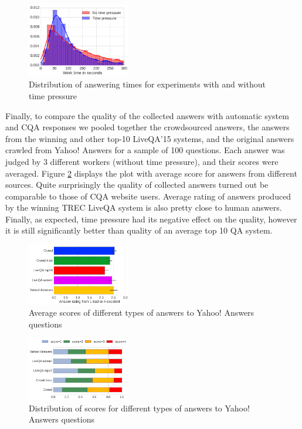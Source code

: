 \begin{figure}[t!]
	\centering
	\includegraphics[width=0.4\textwidth]{img/answering_time_distribution}
	\caption{Distribution of answering times for experiments with and without time pressure}
	\label{fig:answering_time_distribution}
\end{figure}

Finally, to compare the quality of the collected answers with automatic system and CQA responses we pooled together the crowdsourced answers, the answers from the winning and other top-10 LiveQA'15 systems, and the original answers crawled from Yahoo! Answers for a sample of 100 questions.
Each answer was judged by 3 different workers (without time pressure), and their scores were averaged.
Figure \ref{fig:average_score} displays the plot with average score for answers from different sources.
Quite surprisingly the quality of collected answers turned out be comparable to those of CQA website users.
Average rating of answers produced by the winning TREC LiveQA system is also pretty close to human answers.
Finally, as expected, time pressure had its negative effect on the quality, however it is still significantly better than quality of an average top 10 QA system.

\begin{figure}[h]
	\centering
	\includegraphics[width=0.4\textwidth]{img/average_score}
	\caption{Average scores of different types of answers to Yahoo! Answers questions}
	\label{fig:average_score}
\end{figure}

\begin{figure}[h]
	\centering
	\includegraphics[width=0.4\textwidth]{img/scores_distribution}
	\caption{Distribution of scores for different types of answers to Yahoo! Answers questions}
	\label{fig:scores_distribution}
\end{figure}



